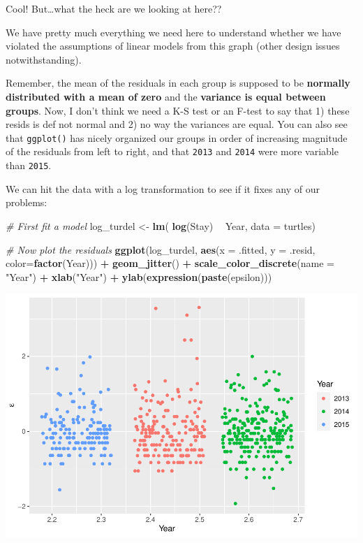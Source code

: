 \documentclass[
]{book}
\newenvironment{Shaded}{\begin{snugshade}}{\end{snugshade}}
\newcommand{\CommentTok}[1]{\textcolor[rgb]{0.56,0.35,0.01}{\textit{#1}}}
\newcommand{\DataTypeTok}[1]{\textcolor[rgb]{0.13,0.29,0.53}{#1}}
\newcommand{\KeywordTok}[1]{\textcolor[rgb]{0.13,0.29,0.53}{\textbf{#1}}}
\newcommand{\NormalTok}[1]{#1}
\newcommand{\OperatorTok}[1]{\textcolor[rgb]{0.81,0.36,0.00}{\textbf{#1}}}
\newcommand{\StringTok}[1]{\textcolor[rgb]{0.31,0.60,0.02}{#1}}
\begin{document}
Cool! But\ldots what the heck are we looking at here??

We have pretty much everything we need here to understand whether we have violated the assumptions of linear models from this graph (other design issues notwithstanding).

Remember, the mean of the residuals in each group is supposed to be \textbf{normally distributed with a mean of zero} and the \textbf{variance is equal between groups}. Now, I don't think we need a K-S test or an F-test to say that 1) these resids is def not normal and 2) no way the variances are equal. You can also see that \texttt{ggplot()} has nicely organized our groups in order of increasing magnitude of the residuals from left to right, and that \texttt{2013} and \texttt{2014} were more variable than \texttt{2015}.

We can hit the data with a log transformation to see if it fixes any of our problems:

\begin{Shaded}
\begin{Highlighting}[]
\CommentTok{# First fit a model}
\NormalTok{log_turdel <-}\StringTok{ }\KeywordTok{lm}\NormalTok{( }\KeywordTok{log}\NormalTok{(Stay) }\OperatorTok{~}\StringTok{ }\NormalTok{Year, }\DataTypeTok{data =}\NormalTok{ turtles) }

\CommentTok{# Now plot the residuals}
\KeywordTok{ggplot}\NormalTok{(log_turdel, }\KeywordTok{aes}\NormalTok{(}\DataTypeTok{x =}\NormalTok{ .fitted, }\DataTypeTok{y =}\NormalTok{ .resid, }\DataTypeTok{color=}\KeywordTok{factor}\NormalTok{(Year))) }\OperatorTok{+}\StringTok{ }
\StringTok{  }\KeywordTok{geom_jitter}\NormalTok{() }\OperatorTok{+}
\StringTok{  }\KeywordTok{scale_color_discrete}\NormalTok{(}\DataTypeTok{name =} \StringTok{"Year"}\NormalTok{) }\OperatorTok{+}
\StringTok{  }\KeywordTok{xlab}\NormalTok{(}\StringTok{"Year"}\NormalTok{) }\OperatorTok{+}\StringTok{ }
\StringTok{  }\KeywordTok{ylab}\NormalTok{(}\KeywordTok{expression}\NormalTok{(}\KeywordTok{paste}\NormalTok{(epsilon)))}
\end{Highlighting}
\end{Shaded}

\includegraphics{worstr_files/figure-latex/unnamed-chunk-237-1.pdf}
\end{document}
